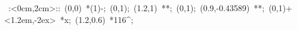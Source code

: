 %


\hbox{
\xy    <2cm,0cm>:<0cm,2cm>::
       (0,0) *\ellipse(1){-}; 
       (0,1); (1.2,1) **\dir{-}; 
       (0,1); (0.9,-0.43589) **\dir{-};
       (0,1)+<1.2em,-2ex> *{x};
       (1.2,0.6)  *{116^\circ};
\endxy}


